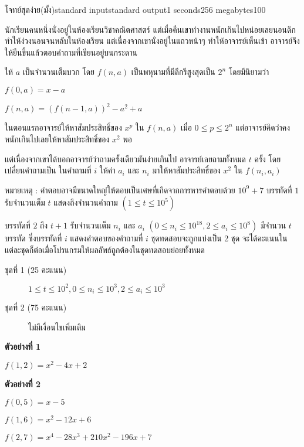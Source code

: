 \documentclass[11pt,a4paper]{article}
\begin{document}
\begin{problem}{โจทย์สุดง่าย(มั้ง)}{standard input}{standard output}{1 seconds}{256 megabytes}{100}

นักเรียนคนหนึ่งนั่งอยู่ในห้องเรียนวิชาคณิตศาสตร์ แต่เมื่อคืนเขาทำงานหนักเกินไปหน่อยเลยนอนดึกทำให้ง่วงนอนจนหลับในห้องเรียน แต่เนื่องจากเขานั่งอยู่ในแถวหน้าๆ ทำให้อาจารย์เห็นเข้า อาจารย์จึงให้ยืนขึ้นแล้วตอบคำถามที่เขียนอยู่บนกระดาน

ให้ $a$ เป็นจำนวนเต็มบวก โดย $f(n , a)$ เป็นพหุนามที่มีดีกรีสูงสุดเป็น $2^{n}$ โดยมีนิยามว่า 
\begin{center}

$f(0 , a) = x - a$ 

$f(n , a) = (f(n-1 , a))^2 - a^2 + a$  

\end{center}

ในตอนแรกอาจารย์ให้หาสัมประสิทธิ์ของ $x^p$ ใน $f(n , a)$ เมื่อ $0 \leq p \leq 2^n$ แต่อาจารย์คิดว่าคงหนักเกินไปเลยให้หาสัมประสิทธิ์ของ $x^2$ พอ

แต่เนื่องจากเขาได้บอกอาจารย์ว่าถามครั้งเดียวมันง่ายเกินไป อาจารย์เลยถามทั้งหมด $t$ ครั้ง โดยเปลี่ยนคำถามเป็น
ในคำถามที่ $i$ ให้ค่า $a_i$ และ $n_i$ มาให้หาสัมประสิทธิ์ของ $x^2$ ใน $f(n_i , a_i)$ 

หมายเหตุ : คำตอบอาจมีขนาดใหญ่ให้ตอบเป็นเศษที่เกิดจากการหารคำตอบด้วย $10^9 + 7$
\InputFile
บรรทัดที่ $1$ รับจำนวนเต็ม $t$ แสดงถึงจำนวนคำถาม $(1 \leq t \leq 10^5)$

บรรทัดที่ $2$ ถึง $t + 1$ รับจำนวนเต็ม $n_i$ และ $a_i$ $(0 \leq n_i \leq10^{18} , 2 \leq a_i \leq 10^8)$
\OutputFile
มีจำนวน $t$ บรรทัด ซึ่งบรรทัดที่ $i$ แสดงคำตอบของคำถามที่ $i$ 
\Scoring
ชุดทดสอบจะถูกแบ่งเป็น 2 ชุด จะได้คะแนนในแต่ละชุดก็ต่อเมื่อโปรแกรมให้ผลลัพธ์ถูกต้องในชุดทดสอบย่อยทั้งหมด

\begin{description}

\item[ชุดที่ 1 (25 คะแนน)]  $1 \leq t \leq 10^2 , 0 \leq n_i \leq 10^3 , 2 \leq a_i \leq 10^3$ 

\item[ชุดที่ 2 (75 คะแนน)] ไม่มีเงื่อนไขเพิ่มเติม

\end{description}

\Examples

\begin{example}
%
%
\end{example}

\Note
\begin{note}
\textbf{ตัวอย่างที่ 1}

$f(1, 2) = x^2 -4x+ 2$

\textbf{ตัวอย่างที่ 2}

$f(0,5)=x - 5$

$f(1,6)=x^2 - 12 x + 6$

$f(2,7)= x^4 - 28 x^3 + 210 x^2 - 196 x + 7$
\end{note}

\end{problem}
\end{document}
